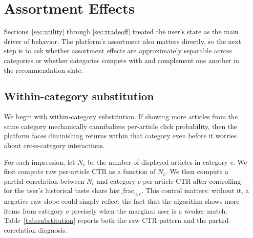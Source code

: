 \documentclass[11pt]{article}
\begin{document}
\section{Assortment Effects}
\label{sec:assortment}

Sections~\ref{sec:utility} through \ref{sec:tradeoff} treated the user's state as the main driver of behavior. The platform's assortment also matters directly, so the next step is to ask whether assortment effects are approximately separable across categories or whether categories compete with and complement one another in the recommendation slate.

\subsection{Within-category substitution}

We begin with within-category substitution. If showing more articles from the same category mechanically cannibalizes per-article click probability, then the platform faces diminishing returns within that category even before it worries about cross-category interactions.

For each impression, let $N_c$ be the number of displayed articles in category $c$. We first compute raw per-article CTR as a function of $N_c$. We then compute a partial correlation between $N_c$ and category-$c$ per-article CTR after controlling for the user's historical taste share $\text{hist\_frac}_{u,c}$. This control matters: without it, a negative raw slope could simply reflect the fact that the algorithm shows more items from category $c$ precisely when the marginal user is a weaker match. Table~\ref{tab:substitution} reports both the raw CTR pattern and the partial-correlation diagnosis.
\end{document}
